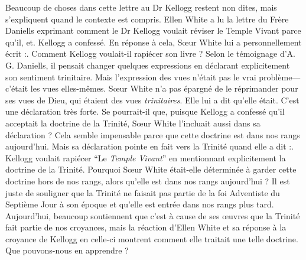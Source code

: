 Beaucoup de choses dans cette lettre au Dr Kellogg restent non dites, mais s'expliquent quand le contexte est compris. Ellen White a lu la lettre du Frère Daniells exprimant comment le Dr Kellogg voulait réviser le Temple Vivant parce qu'il, et. Kellogg a confessé. En réponse à cela, Sœur White lui a personnellement écrit :. Comment Kellogg voulait-il rapiécer son livre ? Selon le témoignage d'A. G. Daniells, il pensait changer quelques expressions en déclarant explicitement son sentiment trinitaire. Mais l'expression des vues n'était pas le vrai problème—c'était les vues elles-mêmes. Sœur White n'a pas épargné de le réprimander pour ses vues de Dieu, qui étaient des vues \textit{trinitaires}. Elle lui a dit qu'elle était. C'est une déclaration très forte. Se pourrait-il que, puisque Kellogg a confessé qu'il acceptait la doctrine de la Trinité, Sœur White l'incluait aussi dans sa déclaration ? Cela semble impensable parce que cette doctrine est dans nos rangs aujourd'hui. Mais sa déclaration pointe en fait vers la Trinité quand elle a dit :. Kellogg voulait rapiécer “Le \textit{Temple Vivant}” en mentionnant explicitement la doctrine de la Trinité. Pourquoi Sœur White était-elle déterminée à garder cette doctrine hors de nos rangs, alors qu'elle est dans nos rangs aujourd'hui ? Il est juste de souligner que la Trinité ne faisait pas partie de la foi Adventiste du Septième Jour à son époque et qu'elle est entrée dans nos rangs plus tard. Aujourd'hui, beaucoup soutiennent que c'est à cause de ses œuvres que la Trinité fait partie de nos croyances, mais la réaction d'Ellen White et sa réponse à la croyance de Kellogg en celle-ci montrent comment elle traitait une telle doctrine. Que pouvons-nous en apprendre ?


